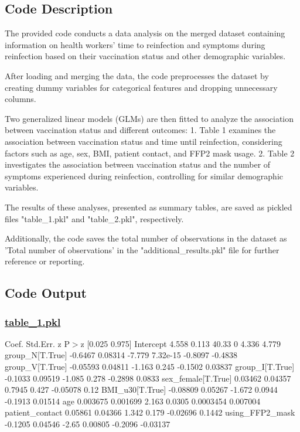 \documentclass[11pt]{article}
\begin{document}
\subsection{Code Description}

The provided code conducts a data analysis on the merged dataset containing information on health workers' time to reinfection and symptoms during reinfection based on their vaccination status and other demographic variables. 

After loading and merging the data, the code preprocesses the dataset by creating dummy variables for categorical features and dropping unnecessary columns. 

Two generalized linear models (GLMs) are then fitted to analyze the association between vaccination status and different outcomes:
1. Table 1 examines the association between vaccination status and time until reinfection, considering factors such as age, sex, BMI, patient contact, and FFP2 mask usage.
2. Table 2 investigates the association between vaccination status and the number of symptoms experienced during reinfection, controlling for similar demographic variables.

The results of these analyses, presented as summary tables, are saved as pickled files "table\_1.pkl" and "table\_2.pkl", respectively.

Additionally, the code saves the total number of observations in the dataset as 'Total number of observations' in the "additional\_results.pkl" file for further reference or reporting.

\subsection{Code Output}\hypertarget{file-table-1-pkl}{}

\subsubsection*{\hyperlink{code-Data Analysis-table-1-pkl}{table\_1.pkl}}

\begin{codeoutput}
                      Coef.  Std.Err.      z     P$>$\textbar{}z\textbar{}    [0.025   0.975]
Intercept             4.558     0.113  40.33         0     4.336    4.779
group\_N[T.True]     -0.6467   0.08314 -7.779  7.32e-15   -0.8097  -0.4838
group\_V[T.True]    -0.05593   0.04811 -1.163     0.245   -0.1502  0.03837
group\_I[T.True]     -0.1033   0.09519 -1.085     0.278   -0.2898   0.0833
sex\_female[T.True]  0.03462   0.04357 0.7945     0.427  -0.05078     0.12
BMI\_u30[T.True]    -0.08809   0.05267 -1.672    0.0944   -0.1913  0.01514
age                0.003675  0.001699  2.163    0.0305 0.0003454 0.007004
patient\_contact     0.05861   0.04366  1.342     0.179  -0.02696   0.1442
using\_FFP2\_mask     -0.1205   0.04546  -2.65   0.00805   -0.2096 -0.03137
\end{codeoutput}\hypertarget{file-table-2-pkl}{}
\end{document}
